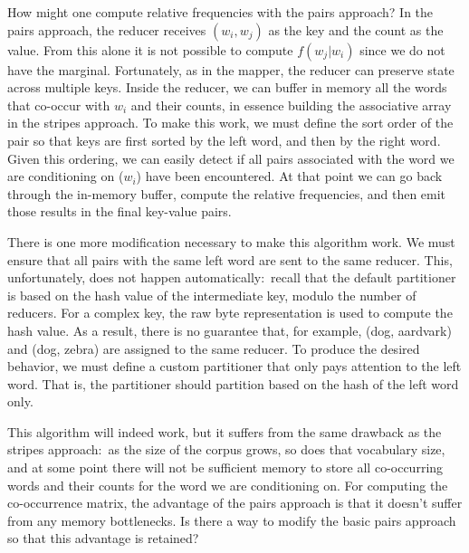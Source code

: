 How might one compute relative frequencies with the pairs approach?
In the pairs approach, the reducer receives $(w_i, w_j)$ as the key and
the count as the value.  From this alone it is not possible to compute
$f(w_j|w_i)$ since we do not have the marginal.  Fortunately, as in the
mapper, the reducer can preserve state across multiple keys.  Inside
the reducer, we can buffer in memory all the words that co-occur with
$w_i$ and their counts, in essence building the associative array in the
stripes approach.  To make this work, we must define the sort order of
the pair so that keys are first sorted by the left word, and then by
the right word.  Given this ordering, we can easily detect if all
pairs associated with the word we are conditioning on ($w_i$) have been
encountered.  At that point we can go back through the in-memory
buffer, compute the relative frequencies, and then emit those results
in the final key-value pairs.

There is one more modification necessary to make this algorithm work.
We must ensure that all pairs with the same left word are sent to the
same reducer.  This, unfortunately, does not happen
automatically:\ recall that the default partitioner is based on the
hash value of the intermediate key, modulo the number of reducers.
For a complex key, the raw byte representation is used to compute the
hash value.  As a result, there is no guarantee that, for example,
(dog, aardvark) and (dog, zebra) are assigned to the same reducer.  To
produce the desired behavior, we must define a custom partitioner that
only pays attention to the left word.  That is, the partitioner should
partition based on the hash of the left word only.

This algorithm will indeed work, but it suffers from the same drawback
as the stripes approach:\ as the size of the corpus grows, so does
that vocabulary size, and at some point there will not be sufficient
memory to store all co-occurring words and their counts for the word
we are conditioning on.  For computing the co-occurrence matrix, the
advantage of the pairs approach is that it doesn't suffer from any
memory bottlenecks.  Is there a way to modify the basic pairs approach
so that this advantage is retained?

